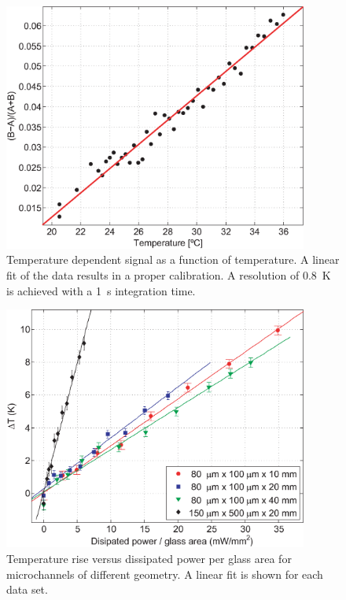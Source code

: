 \documentclass[]{spie}  %
\newcommand{\figsimple}{10cm} %
\begin{document}
\begin{figure}[h!]
\centering
\includegraphics[width=\figsimple]{figs/fig2.eps}
\caption{Temperature dependent signal as a function of temperature. A linear fit of the data results in a proper calibration. A resolution of 0.8~K is achieved with a 1~s integration time. 
\label{fig:calibration}}
\end{figure}

\begin{figure}[h!]
\centering
\includegraphics[width=\figsimple]{figs/fig3.eps}
\caption{Temperature rise versus dissipated power per glass area for microchannels of different geometry. A linear fit is shown for each data set.  \label{fig:rectas}}
\end{figure}
\end{document}
